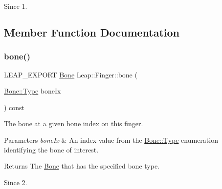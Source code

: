 \begin{DoxyCodeInclude}
\end{DoxyCodeInclude}


\begin{DoxySince}{Since}
1. 
\end{DoxySince}


\subsection{Member Function Documentation}
\mbox{\label{class_leap_1_1_finger_aae013ec7b81ae141042ae64c15331e30}} 
\subsubsection{\texorpdfstring{bone()}{bone()}}
{\footnotesize\ttfamily L\+E\+A\+P\+\_\+\+E\+X\+P\+O\+RT \hyperlink{class_leap_1_1_bone}{Bone} Leap\+::\+Finger\+::bone (\begin{DoxyParamCaption}\item[{\hyperlink{class_leap_1_1_bone_ac2f949e05b22edc21a308df42580b5e1}{Bone\+::\+Type}}]{bone\+Ix }\end{DoxyParamCaption}) const}

The bone at a given bone index on this finger.


\begin{DoxyCodeInclude}
\end{DoxyCodeInclude}



\begin{DoxyParams}{Parameters}
{\em bone\+Ix} & An index value from the \hyperlink{class_leap_1_1_bone_ac2f949e05b22edc21a308df42580b5e1}{Bone\+::\+Type} enumeration identifying the bone of interest. \\
\hline
\end{DoxyParams}
\begin{DoxyReturn}{Returns}
The \hyperlink{class_leap_1_1_bone}{Bone} that has the specified bone type. 
\end{DoxyReturn}
\begin{DoxySince}{Since}
2. 
\end{DoxySince}
\mbox{\label{class_leap_1_1_finger_a2dec17262f38e1bb548da99086c5e8e3}} 
